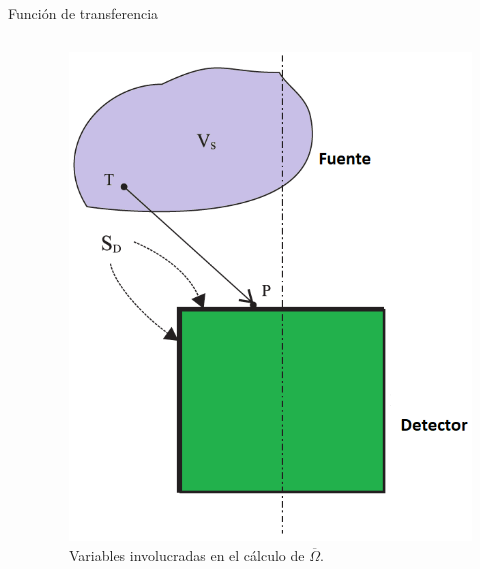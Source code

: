 \documentclass[9pt]{beamer}
\begin{document}
\begin{frame}{Función de transferencia}
\begin{columns}
\begin{column}{0.58\textwidth}
\begin{columns}
			\end{columns}
		\end{column}
		\begin{column}{0.38\textwidth}  
			\begin{figure}
			\centering
			\includegraphics[width=1\textwidth]{Imagenes/EffectiveSolidAngle-3.png}
			\caption{\justifying Variables involucradas en el cálculo de $\overline{\Omega}$.}
			\end{figure}
		\end{column}
	\end{columns}
\end{frame}
\end{document}
